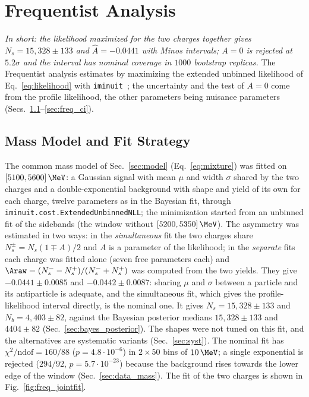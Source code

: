 \section{Frequentist Analysis}
\label{sec:frequentist}
\emph{In short: the likelihood maximized for the two charges together gives $N_s=15{,}328\pm133$ and $\hat A=-0.0441$ with Minos intervals; $A=0$ is rejected at $5.2\sigma$ and the interval has nominal coverage in $1000$ bootstrap replicas.}
The Frequentist analysis estimates \Araw by maximizing the extended unbinned likelihood of Eq.~\eqref{eq:likelihood} with \texttt{iminuit}~\cite{iminuit}; the uncertainty and the test of $A=0$ come from the profile likelihood, the other parameters being nuisance parameters (Secs.~\ref{sec:freq_model}--\ref{sec:freq_ci}).

\subsection{Mass Model and Fit Strategy}
\label{sec:freq_model}
\label{sec:freq_simfit}
The common mass model of Sec.~\ref{sec:model} (Eq.~\eqref{eq:mixture}) was fitted on $[5100,5600]\,\MeV$: a Gaussian signal with mean $\mu$ and width $\sigma$ shared by the two charges and a double-exponential background with shape and yield of its own for each charge, twelve parameters as in the Bayesian fit, through \texttt{iminuit.cost.ExtendedUnbinnedNLL}; the minimization started from an unbinned fit of the sidebands (the window without $[5200,5350]\,\MeV$). The asymmetry was estimated in two ways: in the \emph{simultaneous} fit the two charges share $N_s^\pm=N_s(1\mp A)/2$ and $A$ is a parameter of the likelihood; in the \emph{separate} fits each charge was fitted alone (seven free parameters each) and $\Araw=(N_s^--N_s^+)/(N_s^-+N_s^+)$ was computed from the two yields. They give $-0.0441\pm0.0085$ and $-0.0442\pm0.0087$: sharing $\mu$ and $\sigma$ between a particle and its antiparticle is adequate, and the simultaneous fit, which gives the profile-likelihood interval directly, is the nominal one. It gives $N_s=15{,}328\pm133$ and $N_b=4{,}403\pm82$, against the Bayesian posterior medians $15{,}328\pm133$ and $4404\pm82$ (Sec.~\ref{sec:bayes_posterior}). The shapes were not tuned on this fit, and the alternatives are systematic variants (Sec.~\ref{sec:syst}). The nominal fit has $\chi^2/\mathrm{ndof}=160/88$ ($p=4.8\cdot 10^{-6}$) in $2\times50$ bins of $10\,\MeV$; a single exponential is rejected ($294/92$, $p=5.7\cdot 10^{-23}$) because the background rises towards the lower edge of the window (Sec.~\ref{sec:data_mass}). The fit of the two charges is shown in Fig.~\ref{fig:freq_jointfit}.

